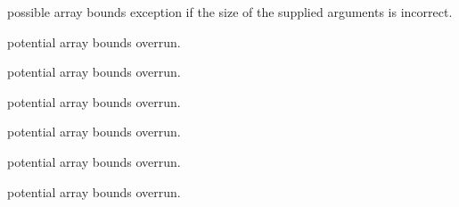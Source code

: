 
\begin{DoxyRefList}
\item[\label{bug__bug000001}%
\hypertarget{bug__bug000001}{}%
Global \hyperlink{group__api_gaf04b41252ebd1a3013b6bcb4dbbf3649}{Line\-Picking\-All\-Problems} (char $\ast$$\ast$, char $\ast$$\ast$)]possible array bounds exception if the size of the supplied arguments is incorrect.  
\item[\label{bug__bug000004}%
\hypertarget{bug__bug000004}{}%
Global \hyperlink{group__api_ga445ba2c007d60d789747cecbd5f874b9}{Line\-Picking\-C\-D\-F} (double $\ast$, double $\ast$, int $\ast$, int $\ast$, double $\ast$, int $\ast$, int $\ast$, char $\ast$$\ast$)]potential array bounds overrun.  
\item[\label{bug__bug000005}%
\hypertarget{bug__bug000005}{}%
Global \hyperlink{group__api_ga89bd29435ffe1826e97dafb2b0536de1}{Line\-Picking\-Ncoords} (int $\ast$, char $\ast$$\ast$, int $\ast$, double $\ast$, int $\ast$, int $\ast$, char $\ast$$\ast$)]potential array bounds overrun.  
\item[\label{bug__bug000003}%
\hypertarget{bug__bug000003}{}%
Global \hyperlink{group__api_ga8feba9835984bd74f3d919f51389e573}{Line\-Picking\-P\-D\-F} (double $\ast$, double $\ast$, int $\ast$, int $\ast$, double $\ast$, int $\ast$, int $\ast$, char $\ast$$\ast$)]potential array bounds overrun.  
\item[\label{bug__bug000007}%
\hypertarget{bug__bug000007}{}%
Global \hyperlink{group__api_gade24923f75c83155e6cf15f3d7d7cb09}{Line\-Picking\-Sim\-Distances} (double $\ast$distances, int $\ast$\-N, int $\ast$problem, double $\ast$parameters, int $\ast$\-Npar, int $\ast$result, char $\ast$$\ast$error\-\_\-str)]potential array bounds overrun.  
\item[\label{bug__bug000006}%
\hypertarget{bug__bug000006}{}%
Global \hyperlink{group__api_gad3880c7898c35953c9c55ced33beb222}{Line\-Picking\-Sim\-Points} (double $\ast$$\ast$points, int $\ast$\-Npoints, int $\ast$\-Ncoords, int $\ast$problem, double $\ast$parameters, int $\ast$\-Npar, int $\ast$result, char $\ast$$\ast$error\-\_\-str)]potential array bounds overrun.  
\item[\label{bug__bug000002}%
\hypertarget{bug__bug000002}{}%
Global \hyperlink{group__api_ga0aec0b2f87903f4bf4ad3011a99b3446}{Line\-Picking\-Support} (double $\ast$, int $\ast$, double $\ast$, int $\ast$, int $\ast$, char $\ast$$\ast$)]potential array bounds overrun. 
\end{DoxyRefList}